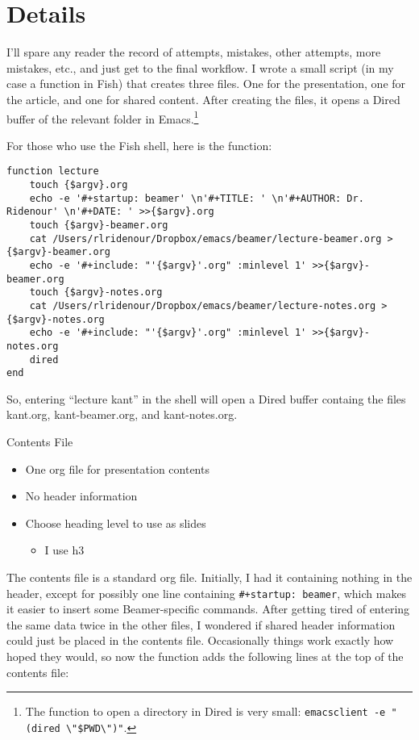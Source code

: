 \documentclass[aspectratio=169,12pt,ignorenonframetext]{beamer}
\begin{document}
\section{Details}
\label{sec:orgdf37848}

I'll spare any reader the record of attempts, mistakes, other attempts, more mistakes, etc., and just get to the final workflow. I wrote a small script (in my case a function in Fish) that creates three files. One for the presentation, one for the article, and one for shared content. After creating the files, it opens a Dired buffer of the relevant folder in Emacs.\footnote{The function to open a directory in Dired is very small: \texttt{emacsclient -e "(dired \textbackslash{}"\$PWD\textbackslash{}")"}.}

For those who use the Fish shell, here is the function:

\begin{verbatim}
function lecture
    touch {$argv}.org
    echo -e '#+startup: beamer' \n'#+TITLE: ' \n'#+AUTHOR: Dr. Ridenour' \n'#+DATE: ' >>{$argv}.org
    touch {$argv}-beamer.org
    cat /Users/rlridenour/Dropbox/emacs/beamer/lecture-beamer.org >{$argv}-beamer.org
    echo -e '#+include: "'{$argv}'.org" :minlevel 1' >>{$argv}-beamer.org
    touch {$argv}-notes.org
    cat /Users/rlridenour/Dropbox/emacs/beamer/lecture-notes.org >{$argv}-notes.org
    echo -e '#+include: "'{$argv}'.org" :minlevel 1' >>{$argv}-notes.org
    dired
end
\end{verbatim}
So, entering  ``lecture kant'' in the shell will open a Dired buffer containg the files kant.org, kant-beamer.org, and kant-notes.org.

\begin{frame}[label={sec:org0bdf4be}]{Contents File}
\begin{itemize}
\item One org file for presentation contents
\item No header information
\item Choose heading level to use as slides
\begin{itemize}
\item I use h3
\end{itemize}
\end{itemize}
\end{frame}

The contents file is a standard org file. Initially, I had it containing nothing in the header, except for possibly one line containing \texttt{\#+startup: beamer}, which makes it easier to insert some Beamer-specific commands. After getting tired of entering the same data twice in the other files, I wondered if shared header information could just be placed in the contents file. Occasionally things work exactly how hoped they would, so now the function adds the following lines at the top of the contents file:
\end{document}
